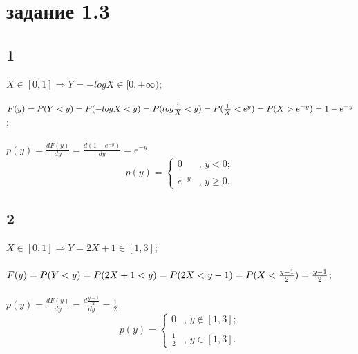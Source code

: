 \documentclass[a4paper]{article}
\begin{document}
	\section*{задание 1.3}
	\begin{large}
		\subsection*{1}
		$X \in [0,1] \Rightarrow Y=-logX \in [0,+\infty)$;\\
		\\
		$F(y)=P(Y<y)=P(-logX<y)=P(log\frac{1}{X}<y)=\\
		\\
		P(\frac{1}{X}<e^y)=P(X>e^{-y})=1-e^{-y}$;\\
		\\
		$p(y)=\frac{dF(y)}{dy}=\frac{d(1-e^{-y})}{dy}=e^{-y}$\\
		\[ p(y) = \left\{ \begin{array}{ll}
			0 & \mbox{, $y<0$};\\
			\\
			e^{-y} & \mbox{, $y \ge 0$}.\end{array} \right. \]
		\subsection*{2}
		$X \in [0,1] \Rightarrow Y=2X+1 \in [1,3]$;\\
		\\
		$F(y)=P(Y<y)=P(2X+1<y)=P(2X<y-1)=\\
		\\
		P(X<\frac{y-1}{2})=\frac{y-1}{2}$;\\
		\\
		$p(y)=\frac{dF(y)}{dy}=\frac{d\frac{y-1}{2}}{dy}=\frac{1}{2}$\\
		\[ p(y) = \left\{ \begin{array}{ll}
			0 & \mbox{, $y \notin [1,3]$};\\
			\\
			\frac{1}{2} & \mbox{, $y \in [1,3]$}.\end{array} \right. \]

\end{large}
\end{document}
